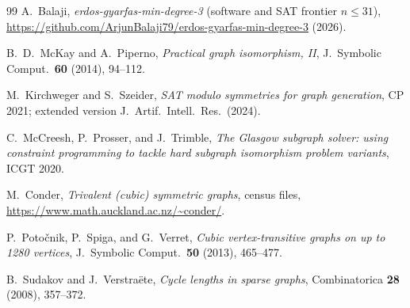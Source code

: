 \documentclass[11pt]{article}
\theoremstyle{remark}
\begin{document}
\begin{thebibliography}{99}
 A.~Balaji,
\emph{erdos-gyarfas-min-degree-3} (software and SAT frontier $n \le 31$),
\url{https://github.com/ArjunBalaji79/erdos-gyarfas-min-degree-3} (2026).

 B.~D.~McKay and A.~Piperno,
\emph{Practical graph isomorphism, II},
J.\ Symbolic Comput.\ \textbf{60} (2014), 94--112.

 M.~Kirchweger and S.~Szeider,
\emph{SAT modulo symmetries for graph generation},
CP 2021; extended version J.\ Artif.\ Intell.\ Res.\ (2024).

 C.~McCreesh, P.~Prosser, and J.~Trimble,
\emph{The Glasgow subgraph solver: using constraint programming to tackle
hard subgraph isomorphism problem variants}, ICGT 2020.

 M.~Conder,
\emph{Trivalent (cubic) symmetric graphs}, census files,
\url{https://www.math.auckland.ac.nz/~conder/}.

 P.~Poto\v{c}nik, P.~Spiga, and G.~Verret,
\emph{Cubic vertex-transitive graphs on up to 1280 vertices},
J.\ Symbolic Comput.\ \textbf{50} (2013), 465--477.

 B.~Sudakov and J.~Verstra\"ete,
\emph{Cycle lengths in sparse graphs},
Combinatorica \textbf{28} (2008), 357--372.

\end{thebibliography}
\end{document}
